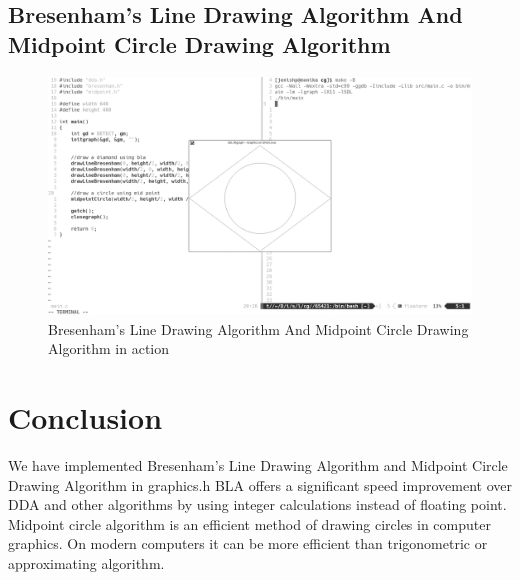 \documentclass[12pt]{article}
\begin{document}
	\subsection{Bresenham's Line Drawing Algorithm And Midpoint Circle Drawing Algorithm}
	\begin{figure}[!h]
		\hspace*{-1cm}
		\centering
		\includegraphics[width=1.01\linewidth]{output2.png}
		\caption{Bresenham's Line Drawing Algorithm And Midpoint Circle Drawing Algorithm in action}
		\label{fig:bresenham and circle}
	\end{figure}

	\section{Conclusion}
	We have implemented Bresenham's Line Drawing Algorithm and Midpoint Circle Drawing Algorithm in graphics.h
	BLA offers a significant speed improvement over DDA and other algorithms by using integer calculations instead of floating point.
	Midpoint circle algorithm is an efficient method of drawing circles in computer graphics. On modern computers it can be more efficient than trigonometric or approximating algorithm.
\end{document}
